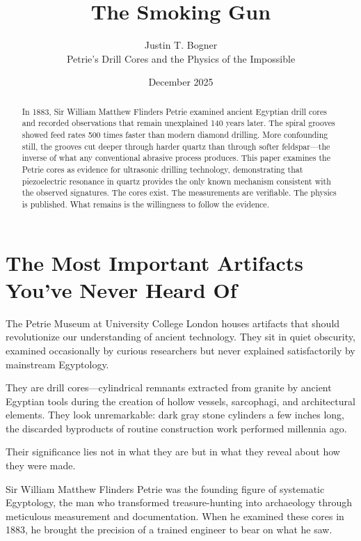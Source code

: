 \documentclass[11pt]{article}
\title{The Smoking Gun}
\author{Justin T. Bogner\\[0.5em]\small Petrie's Drill Cores and the Physics of the Impossible}
\date{December 2025}
\begin{document}
\maketitle
\thispagestyle{empty}

\begin{abstract}
In 1883, Sir William Matthew Flinders Petrie examined ancient Egyptian drill cores and recorded observations that remain unexplained 140 years later. The spiral grooves showed feed rates 500 times faster than modern diamond drilling. More confounding still, the grooves cut deeper through harder quartz than through softer feldspar---the inverse of what any conventional abrasive process produces. This paper examines the Petrie cores as evidence for ultrasonic drilling technology, demonstrating that piezoelectric resonance in quartz provides the only known mechanism consistent with the observed signatures. The cores exist. The measurements are verifiable. The physics is published. What remains is the willingness to follow the evidence.
\end{abstract}

\tableofcontents
\newpage

\section{The Most Important Artifacts You've Never Heard Of}

The Petrie Museum at University College London houses artifacts that should revolutionize our understanding of ancient technology. They sit in quiet obscurity, examined occasionally by curious researchers but never explained satisfactorily by mainstream Egyptology.

They are drill cores---cylindrical remnants extracted from granite by ancient Egyptian tools during the creation of hollow vessels, sarcophagi, and architectural elements. They look unremarkable: dark gray stone cylinders a few inches long, the discarded byproducts of routine construction work performed millennia ago.

Their significance lies not in what they are but in what they reveal about how they were made.

Sir William Matthew Flinders Petrie was the founding figure of systematic Egyptology, the man who transformed treasure-hunting into archaeology through meticulous measurement and documentation. When he examined these cores in 1883, he brought the precision of a trained engineer to bear on what he saw.
\end{document}
